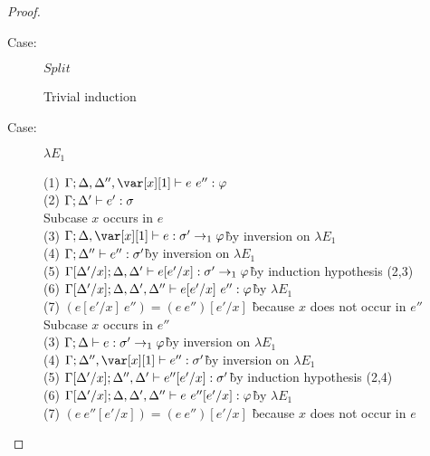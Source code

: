 \begin{proof}
\begin{description}
\item[Case:] $Split$
\begin{tabbing}
    Trivial induction
\end{tabbing}

\item[Case:] $\lambda E_1$
\begin{tabbing}
  (1) $\G; \D,\D'',\xl \vdash e~e'' : \vp$\\
  (2) $\Gamma; \Delta' \vdash e' : \sigma$\\
  Subcase $x$ occurs in $e$\\
  (3) $\G; \D,\xl \vdash e : \s' \to_1 \vp$\` by inversion on $\lambda E_1$\\
  (4) $\Gamma; \Delta'' \vdash e'' : \sigma'$\` by inversion on $\lambda E_1$\\
  (5) $\Gamma[\Delta'/x]; \Delta, \Delta' \vdash e[e'/x] : \sigma' \to_1 \varphi$\` by induction hypothesis (2,3)\\
  (6) $\Gamma[\Delta'/x]; \Delta, \Delta', \Delta'' \vdash e[e'/x]~e'' : \varphi$\` by $\lambda E_1$\\
  (7) $(e[e'/x]~e'') = (e~e'')[e'/x]$ \` because $x$ does not occur in $e''$\\
  Subcase $x$ occurs in $e''$\\
  (3) $\Gamma; \Delta \vdash e : \sigma' \to_1 \varphi$\` by inversion on $\lambda E_1$\\
  (4) $\G; \D'', \xl \vdash e'' : \s'$\` by inversion on $\lambda E_1$\\
  (5) $\Gamma[\Delta'/x]; \Delta'',\Delta' \vdash e''[e'/x] : \sigma'$\` by induction hypothesis (2,4)\\
  (6) $\Gamma[\Delta'/x]; \Delta,\Delta',\Delta'' \vdash e~e''[e'/x] : \varphi$\` by $\lambda E_1$\\
  (7) $(e~e''[e'/x]) = (e~e'')[e'/x]$ \` because $x$ does not occur in $e$\\
\end{tabbing}


\end{description}
\end{proof}
